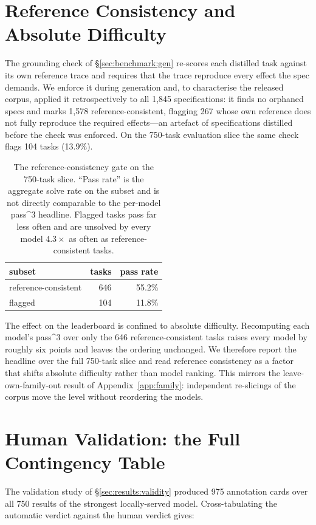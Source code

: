 \section{Reference Consistency and Absolute Difficulty}
\label{app:refconsist}
The grounding check of \S\ref{sec:benchmark:gen} re-scores each distilled task
against its own reference trace and requires that the trace reproduce every
effect the spec demands. We enforce it during generation and, to characterise
the released corpus, applied it retrospectively to all 1{,}845 specifications:
it finds no orphaned specs and marks 1{,}578 reference-consistent, flagging 267
whose own reference does not fully reproduce the required effects---an artefact
of specifications distilled before the check was enforced. On the 750-task
evaluation slice the same check flags 104 tasks (13.9\%).

\begin{table}[h]
  \centering \small
  \begin{tabular}{lrr}
    \toprule
    subset & tasks & pass rate \\
    \midrule
    reference-consistent & 646 & 55.2\% \\
    flagged              & 104 & 11.8\% \\
    \bottomrule
  \end{tabular}
  \caption{The reference-consistency gate on the 750-task slice. ``Pass rate''
    is the aggregate solve rate on the subset and is not directly comparable to
    the per-model pass\textasciicircum{}3 headline. Flagged tasks pass far less
    often and are unsolved by every model $4.3\times$ as often as
    reference-consistent tasks.}
  \label{tab:refconsist}
\end{table}

\noindent The effect on the leaderboard is confined to absolute difficulty.
Recomputing each model's pass\textasciicircum{}3 over only the 646
reference-consistent tasks raises every model by roughly six points and leaves
the ordering unchanged. We therefore report the headline over the full 750-task
slice and read reference consistency as a factor that shifts absolute difficulty
rather than model ranking. This mirrors the leave-own-family-out result of
Appendix~\ref{app:family}: independent re-slicings of the corpus move the level
without reordering the models.

\section{Human Validation: the Full Contingency Table}
\label{app:human}
The validation study of \S\ref{sec:results:validity} produced 975 annotation
cards over all 750 results of the strongest locally-served model. Cross-tabulating
the automatic verdict against the human verdict gives:

